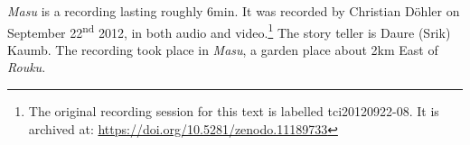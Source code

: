 \textit{Masu} is a recording lasting roughly 6min. It was recorded by Christian Döhler on September 22\textsuperscript{nd} 2012, in both audio and video.\footnote{The original recording session for this text is labelled tci20120922-08. It is archived at: \href{https://doi.org/10.5281/zenodo.11189733}{https://doi.org/10.5281/zenodo.11189733}} The story teller is Daure (Srik) Kaumb. The recording took place in \textit{Masu}, a garden place about 2km East of \textit{Rouku}.